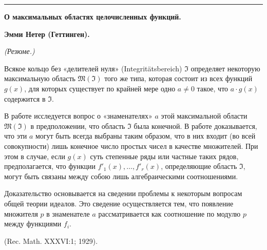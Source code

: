 \bigskip
\begin{center}\rule{4cm}{0.4pt}\end{center}
\begingroup
{}
\begin{center}
{\Large\bfseries О максимальных областях целочисленных функций.}\par
\vspace{0.7em}
{\bfseries Эмми Нетер (Геттинген).}\par
\vspace{0.5em}
\emph{(Резюме.)}
\end{center}

Всякое кольцо без «делителей нуля» (Integritätsbereich) $\mathfrak{I}$ определяет некоторую максимальную область $\mathfrak{M}(\mathfrak{I})$ того же типа, которая состоит из всех функций $g(x)$, для которых существует по крайней мере одно $a\ne0$ такое, что $a\cdot g(x)$ содержится в $\mathfrak{I}$.

В работе исследуется вопрос о «знаменателях» $a$ этой максимальной области $\mathfrak{M}(\mathfrak{I})$ в предположении, что область $\mathfrak{I}$ была конечной. В работе доказывается, что эти $a$ могут быть всегда выбраны таким образом, что в них входит (во всей совокупности) лишь конечное число простых чисел в качестве множителей. При этом в случае, если $g(x)$ суть степенные ряды или частные таких рядов, предполагается, что функции $f'_1(x),\ldots,f'_r(x)$, определяющие область $\mathfrak{I}$, могут быть связаны между собою лишь алгебраическими соотношениями.

Доказательство основывается на сведении проблемы к некоторым вопросам общей теории идеалов. Это сведение осуществляется тем, что появление множителя $p$ в знаменателе $a$ рассматривается как соотношение по модулю $p$ между функциями $f_i$.

\begin{center}
(Rec. Math. XXXVI:1; 1929).
\end{center}
\endgroup

\setcounter{footnote}{0}
\clearpage

